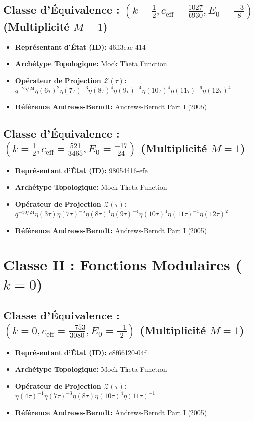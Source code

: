 \documentclass[11pt,twoside,openright]{book}
\begin{document}
\subsection*{Classe d'Équivalence : $(k=\frac{1}{2}, c_{\text{eff}}=\frac{1027}{6930}, E_0=\frac{-3}{8})$ (Multiplicité $M=1$)}
\begin{itemize}
  \item \textbf{Représentant d'État (ID):} 46ff3eae-414
  \item \textbf{Archétype Topologique:} Mock Theta Function
  \item \textbf{Opérateur de Projection $\mathcal{Z}(\tau)$:} $q^{-25/24} \eta(6\tau)^{2} \eta(7\tau)^{-3} \eta(8\tau)^{4} \eta(9\tau)^{-4} \eta(10\tau)^{4} \eta(11\tau)^{-6} \eta(12\tau)^{4}$
  \item \textbf{Référence Andrews-Berndt:} Andrews-Berndt Part I (2005)
\end{itemize}

\subsection*{Classe d'Équivalence : $(k=\frac{1}{2}, c_{\text{eff}}=\frac{521}{3465}, E_0=\frac{-17}{24})$ (Multiplicité $M=1$)}
\begin{itemize}
  \item \textbf{Représentant d'État (ID):} 98054d16-efe
  \item \textbf{Archétype Topologique:} Mock Theta Function
  \item \textbf{Opérateur de Projection $\mathcal{Z}(\tau)$:} $q^{-50/24} \eta(3\tau) \eta(7\tau)^{-5} \eta(8\tau)^{4} \eta(9\tau)^{-4} \eta(10\tau)^{4} \eta(11\tau)^{-1} \eta(12\tau)^{2}$
  \item \textbf{Référence Andrews-Berndt:} Andrews-Berndt Part I (2005)
\end{itemize}

\section{Classe II : Fonctions Modulaires ($k = 0$)}

\subsection*{Classe d'Équivalence : $(k=0, c_{\text{eff}}=\frac{-753}{3080}, E_0=\frac{-1}{2})$ (Multiplicité $M=1$)}
\begin{itemize}
  \item \textbf{Représentant d'État (ID):} c8f66120-04f
  \item \textbf{Archétype Topologique:} Mock Theta Function
  \item \textbf{Opérateur de Projection $\mathcal{Z}(\tau)$:} $\eta(4\tau)^{-1} \eta(7\tau)^{-3} \eta(8\tau) \eta(10\tau)^{4} \eta(11\tau)^{-1}$
  \item \textbf{Référence Andrews-Berndt:} Andrews-Berndt Part I (2005)
\end{itemize}
\end{document}
